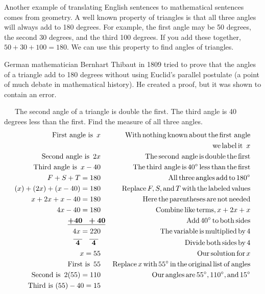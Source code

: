  Another example of translating English sentences to mathematical sentences
comes from geometry. A well known property of triangles is that all three
angles will always add to 180 degrees. For example, the first angle may be 50 degrees,
the second 30 degrees, and the third 100 degrees. If you add these together,
$50 + 30 + 100 = 180$. We can use this property to find angles of triangles.\pp

 {}German mathematician Bernhart Thibaut in 1809
tried to prove that the angles of a triangle add to 180 degrees without using Euclid's
parallel postulate (a point of much debate in mathematical history). He created a
proof, but it was shown to contain an error.

\begin{example}\label{Lin79}~~~The second angle of a triangle is double the first. The third angle is 40 degrees
  less than the first. Find the measure of all three angles.
  \begin{eqnarray*}
    \operatorname{First~angle~is~} x~~ &  & \operatorname{With} \operatorname{nothing} \operatorname{known} \operatorname{about}
    \operatorname{the} \operatorname{first~angle}\\
		& & ~~~\operatorname{we} \operatorname{label} \operatorname{it~} x\\
    \operatorname{Second~angle~is~} 2 x~~ &  & \operatorname{The} \operatorname{second~angle} \operatorname{is} \operatorname{double}
    \operatorname{the} \operatorname{first}\\
    \operatorname{Third~angle~is~} x - 40~~ &  & \operatorname{The} \operatorname{third~angle} \operatorname{is} 40^{\circ} \operatorname{less}
    \operatorname{than} \operatorname{the} \operatorname{first}\\
    F + S + T = 180~~ &  & \operatorname{All} \operatorname{three} \operatorname{angles} \operatorname{add}
    \operatorname{to} 180^{\circ}\\
    (x) + (2 x) + (x - 40) = 180~~ &  & \operatorname{Replace} F, S, \operatorname{and} T
    \operatorname{with} \operatorname{the} \operatorname{labeled} \operatorname{values}\\
    x + 2 x + x - 40 = 180~~ &  & \operatorname{Here} \operatorname{the} \operatorname{parentheses}
    \operatorname{are} \operatorname{not} \operatorname{needed}\\
    4 x - 40 = 180~~ &  & \operatorname{Combine} \operatorname{like} \operatorname{terms}, x + 2 x + x\\
    \underline{\boldsymbol{+ 40 ~~+ 40}} &  & \operatorname{Add} 40^{\circ} \operatorname{to} \operatorname{both}
    \operatorname{sides}\\
    4 x = 220~~ &  & \operatorname{The} \operatorname{variable} \operatorname{is} \operatorname{multiplied}
    \operatorname{by} 4\\
    \boldsymbol{\overline{~4~} ~~~ \overline{~4~}}~~~ &  & \operatorname{Divide} \operatorname{both}
    \operatorname{sides} \operatorname{by} 4\\
    x = 55~~ &  & \operatorname{Our} \operatorname{solution} \operatorname{for} x\\
    \operatorname{First~is~} 55~~ &  & \operatorname{Replace} x \operatorname{with} 55^{\circ} \operatorname{in} \operatorname{the}
    \operatorname{original} \operatorname{list} \operatorname{of} \operatorname{angles}\\
    \operatorname{Second~is~} 2 (55) = 110~~ &  & \operatorname{Our} \operatorname{angles} \operatorname{are} 55^{\circ},
    110^{\circ}, \operatorname{and} 15^{\circ}\\
    \operatorname{Third~is~} (55) - 40 = 15~~ &  & 
  \end{eqnarray*}
\end{example}

